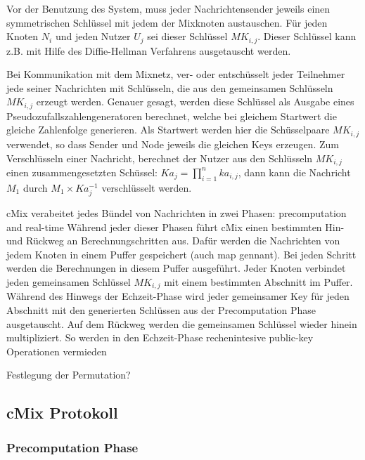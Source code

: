 \documentclass[
    fontsize=12pt,
    headings=small,
    parskip=half,           %
    bibliography=totoc,
    numbers=noenddot,       %
    open=any,               %
    ]{scrreprt}
\begin{document}
Vor der Benutzung des System, muss jeder Nachrichtensender jeweils einen symmetrischen Schlüssel mit jedem der Mixknoten austauschen.
Für jeden Knoten $N_i$ und jeden Nutzer $U_j$ sei dieser Schlüssel $MK_{i,j}$.
Dieser Schlüssel kann z.B. mit Hilfe des Diffie-Hellman Verfahrens ausgetauscht werden.

Bei Kommunikation mit dem Mixnetz, ver- oder entschüsselt jeder Teilnehmer jede seiner Nachrichten mit Schlüsseln, die aus den gemeinsamen Schlüsseln $MK_{i,j}$ erzeugt werden.
Genauer gesagt, werden diese Schlüssel als Ausgabe eines Pseudozufallszahlengeneratoren berechnet, welche bei gleichem Startwert die gleiche Zahlenfolge generieren.
Als Startwert werden hier die Schüsselpaare $MK_{i,j}$ verwendet, so dass Sender und Node jeweils die gleichen Keys erzeugen.
Zum Verschlüsseln einer Nachricht, berechnet der Nutzer aus den Schlüsseln $MK_{i,j}$
einen zusammengesetzten Schüssel: $Ka_j = \prod_{i=1}^{n} ka_{i,j}$,
dann kann die Nachricht $M_1$ durch $M_1 \times Ka_{j}^{-1}$ verschlüsselt werden.

cMix verabeitet jedes Bündel von Nachrichten in zwei Phasen:
precomputation and real-time
Während jeder dieser Phasen führt cMix einen bestimmten Hin- und Rückweg an Berechnungschritten aus.
Dafür werden die Nachrichten von jedem Knoten in einem Puffer gespeichert (auch map gennant).
Bei jeden Schritt werden die Berechnungen in diesem Puffer ausgeführt.
Jeder Knoten verbindet jeden gemeinsamen Schlüssel $MK_{i,j}$ mit einem bestimmten Abschnitt im Puffer.
Während des Hinwegs der Echzeit-Phase wird jeder gemeinsamer Key für jeden Abschnitt mit den generierten Schlüssen aus der Precomputation Phase ausgetauscht.
Auf dem Rückweg werden die gemeinsamen Schlüssel wieder hinein multipliziert.
So werden in den Echzeit-Phase rechenintesive public-key Operationen vermieden


Festlegung der Permutation?


\subsection{cMix Protokoll}
\subsubsection{Precomputation Phase}
\end{document}
